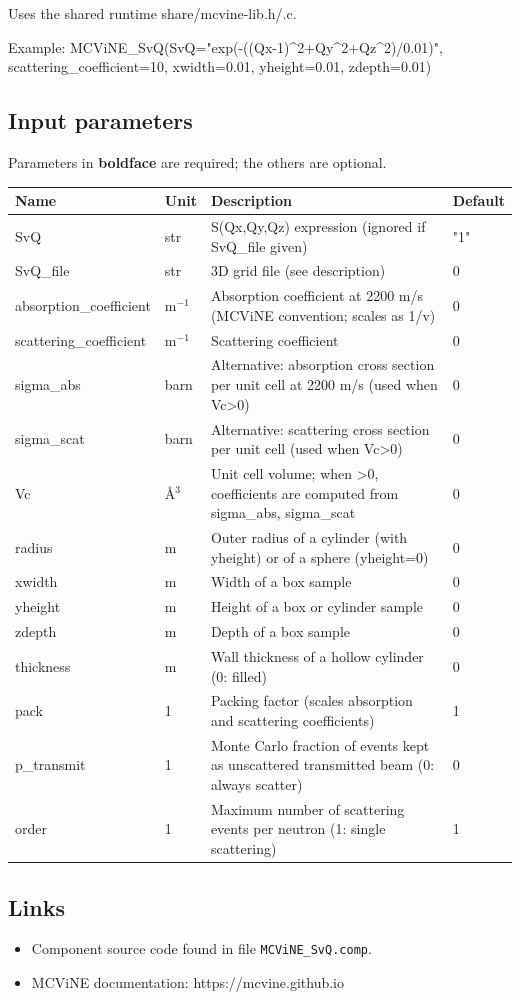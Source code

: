 Uses the shared runtime share/mcvine-lib.h/.c.

Example: MCViNE\_SvQ(SvQ="exp(-((Qx-1)\textasciicircum{}2+Qy\textasciicircum{}2+Qz\textasciicircum{}2)/0.01)", scattering\_coefficient=10, xwidth=0.01, yheight=0.01, zdepth=0.01)

\subsection*{Input parameters}
Parameters in \textbf{boldface} are required; the others are optional.

\begin{longtable}{p{}p{}p{}p{}}
\toprule
\textbf{Name} & \textbf{Unit} & \textbf{Description} & \textbf{Default} \\
\midrule
\endhead
SvQ & str & S(Qx,Qy,Qz) expression (ignored if SvQ\_file given) & "1" \\
SvQ\_file & str & 3D grid file (see description) & 0 \\
absorption\_coefficient & m$^{-1}$ & Absorption coefficient at 2200 m/s (MCViNE convention; scales as 1/v) & 0 \\
scattering\_coefficient & m$^{-1}$ & Scattering coefficient & 0 \\
sigma\_abs & barn & Alternative: absorption cross section per unit cell at 2200 m/s (used when Vc\textgreater{}0) & 0 \\
sigma\_scat & barn & Alternative: scattering cross section per unit cell (used when Vc\textgreater{}0) & 0 \\
Vc & \AA{}$^{3}$ & Unit cell volume; when \textgreater{}0, coefficients are computed from sigma\_abs, sigma\_scat & 0 \\
radius & m & Outer radius of a cylinder (with yheight) or of a sphere (yheight=0) & 0 \\
xwidth & m & Width of a box sample & 0 \\
yheight & m & Height of a box or cylinder sample & 0 \\
zdepth & m & Depth of a box sample & 0 \\
thickness & m & Wall thickness of a hollow cylinder (0: filled) & 0 \\
pack & 1 & Packing factor (scales absorption and scattering coefficients) & 1 \\
p\_transmit & 1 & Monte Carlo fraction of events kept as unscattered transmitted beam (0: always scatter) & 0 \\
order & 1 & Maximum number of scattering events per neutron (1: single scattering) & 1 \\
\bottomrule
\end{longtable}

\subsection*{Links}
\begin{itemize}
  \item Component source code found in file \texttt{MCViNE\_SvQ.comp}.
  \item MCViNE documentation: https://mcvine.github.io
\end{itemize}
